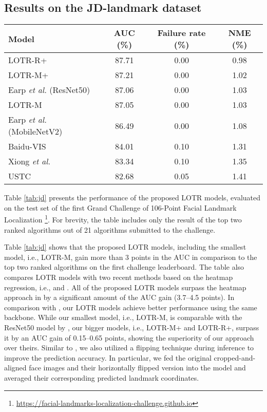 \documentclass[journal]{IEEEtran}
\begin{document}
\subsection{Results on the JD-landmark dataset}\label{subsubsec:jd}

\begin{table*}
\caption{The evaluation results for different LOTR models on the JD-landmark test set;  and  denote the first and second place entries.}
\centering
\begin{tabular}{lccc}
\hline
Model              & AUC (\%) & Failure rate (\%) & NME (\%) \\

\hline
LOTR-R+            & 87.71 & 0.00 & 0.98 \\
LOTR-M+            & 87.21 & 0.00 & 1.02 \\
Earp \textit{et al.} (ResNet50) \cite{earp2021sub}         & 87.06 & 0.00 & 1.03 \\
LOTR-M             & 87.05 & 0.00 &  1.03\\   Earp \textit{et al.} (MobileNetV2) \cite{earp2021sub}    & 86.49 & 0.00 & 1.08 \\
Baidu-VIS & 84.01 & 0.10 & 1.31 \\
Xiong \textit{et al.} \cite{xiong2020}   & 83.34 & 0.10 & 1.35 \\
USTC     & 82.68 & 0.05 & 1.41 \\
\hline
\end{tabular}
\par
\label{tab:jd}
\end{table*}    


Table \ref{tab:jd} presents the performance of the proposed LOTR models, evaluated on the test set of the first Grand Challenge of 106-Point Facial Landmark Localization
\footnote{\label{footnote:jd1}\href{https://facial-landmarks-localization-challenge.github.io}{https://facial-landmarks-localization-challenge.github.io}}. 
For brevity, the table includes only the result of the top two ranked algorithms out of 21 algorithms submitted to the challenge.

Table \ref{tab:jd} shows that the proposed LOTR models, including the smallest model, i.e., LOTR-M, gain more than 3 points in the AUC in comparison to the top two ranked algorithms on the first challenge leaderboard.
The table also compares LOTR models with two recent methods based on the heatmap regression, i.e., \cite{earp2021sub} and \cite{xiong2020}. 
All of the proposed LOTR models surpass the heatmap approach in \cite{xiong2020} by a significant amount of the AUC gain (3.7--4.5 points). 
In comparison with \cite{earp2021sub}, our LOTR models achieve better performance using the same backbone. 
While our smallest model, i.e., LOTR-M, is comparable with the ResNet50 model by \cite{earp2021sub}, our bigger models, i.e., LOTR-M+ and LOTR-R+, surpass it by an AUC gain of 0.15--0.65 points, showing the superiority of our approach over theirs.
Similar to \cite{earp2021sub}, we also utilized a flipping technique during inference to improve the prediction accuracy. 
In particular, we fed the original cropped-and-aligned face images and their horizontally flipped version into the model and averaged their corresponding predicted landmark coordinates.
\end{document}
